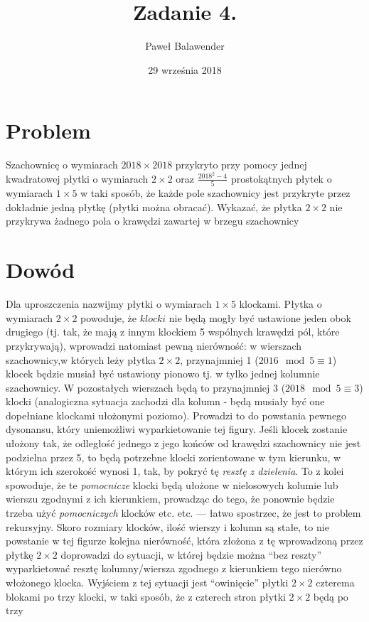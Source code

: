 \documentclass[11pt]{article}
\title{Zadanie 4.}
\date{29 września 2018}
\author{Paweł Balawender}
\begin{document}
\maketitle

\section*{Problem}
\begin{justify}
Szachownicę o wymiarach $2018 \times 2018$ przykryto przy pomocy jednej
kwadratowej płytki o wymiarach $2 \times 2$ oraz $\frac{2018^2-4}{5}$
prostokątnych płytek o wymiarach $1 \times 5$ w taki sposób, że każde pole szachownicy jest przykryte
przez dokładnie jedną płytkę (płytki można obracać). Wykazać, że płytka $2\times2$ nie przykrywa żadnego pola o krawędzi zawartej w brzegu szachownicy
\section*{Dowód}
Dla uproszczenia nazwijmy płytki o wymiarach $1 \times 5$ klockami.
Płytka o wymiarach $2 \times 2$ powoduje, że $klocki$ nie będą mogły być ustawione jeden obok drugiego
(tj. tak, że mają z innym klockiem 5 wspólnych krawędzi pól, które przykrywają), wprowadzi natomiast pewną nierówność: w wierszach szachownicy,w których leży płytka $2 \times 2$, przynajmniej 1 ($2016 \mod 5 \equiv 1$) klocek będzie musiał być ustawiony pionowo tj. w tylko jednej kolumnie szachownicy.
W pozostałych wierszach będą to przynajmniej 3 ($2018\mod 5 \equiv 3$) klocki (analogiczna sytuacja zachodzi dla kolumn - będą musiały być one dopełniane klockami ułożonymi poziomo). Prowadzi to do powstania pewnego dysonansu, który uniemożliwi wyparkietowanie tej figury.
Jeśli klocek zostanie ułożony tak, że odległość jednego z jego końców od krawędzi szachownicy nie jest podzielna przez 5, to będą potrzebne klocki zorientowane w tym kierunku, w którym ich szerokość wynosi 1, tak, by pokryć tę \textit{resztę z dzielenia}. To z kolei spowoduje, że te \textit{pomocnicze} klocki będą ułożone w nielosowych
kolumie lub wierszu zgodnymi z ich kierunkiem, prowadząc do tego, że ponownie będzie trzeba użyć \textit{pomocniczych} klocków etc. etc. --- łatwo spostrzec, że jest to problem rekursyjny. Skoro rozmiary klocków, ilość wierszy i kolumn są stałe, to nie powstanie w tej figurze kolejna nierówność, która
złożona z tę wprowadzoną przez płytkę $2 \times 2$ doprowadzi do sytuacji,  w której będzie można \enquote{bez reszty} wyparkietować resztę kolumny/wiersza zgodnego z kierunkiem tego nierówno włożonego klocka. Wyjściem z tej sytuacji jest \enquote{owinięcie} płytki $2 \times 2$ czterema blokami po trzy klocki, w taki sposób, że z czterech stron płytki $2 \times 2$ będą po trzy 

\end{justify}
\end{document}
